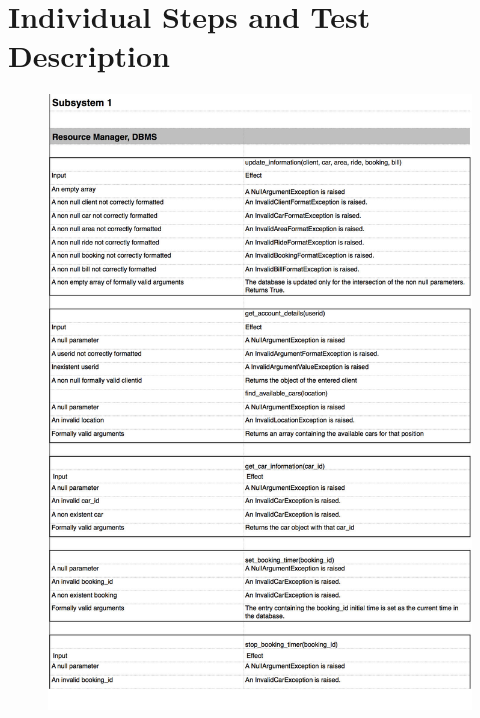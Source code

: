 \documentclass[a4paper,10pt]{article}
\begin{document}
\section{Individual Steps and Test Description}
  \begin{figure}[!h]
  \centering
    \includegraphics[scale=0.26]{Resources/1.jpg}
  \end{figure}
\end{document}
